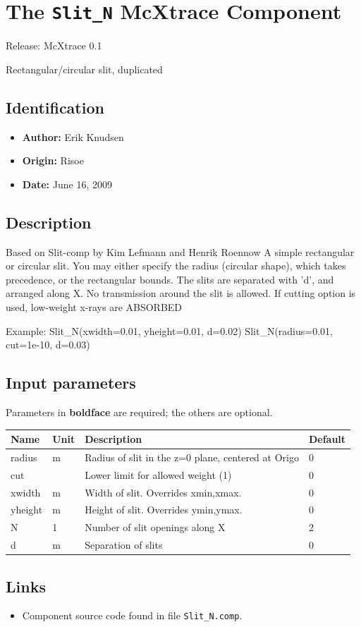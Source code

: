 \section{The \texttt{Slit\_N} McXtrace Component}
Release: McXtrace 0.1

Rectangular/circular slit, duplicated

\subsection*{Identification}
\begin{itemize}
  \item \textbf{Author:} Erik Knudsen
  \item \textbf{Origin:} Risoe
  \item \textbf{Date:} June 16, 2009
\end{itemize}

\subsection*{Description}
Based on Slit-comp by Kim Lefmann and Henrik Roennow A simple rectangular or circular slit. You may either specify the radius (circular shape), which takes precedence, or the rectangular bounds. The slits are separated with 'd', and arranged along X. No transmission around the slit is allowed. If cutting option is used, low-weight x-rays are ABSORBED

Example: Slit\_N(xwidth=0.01, yheight=0.01, d=0.02) Slit\_N(radius=0.01, cut=1e-10, d=0.03)

\subsection*{Input parameters}
Parameters in \textbf{boldface} are required; the others are optional.

\begin{longtable}{p{}p{}p{}p{}}
\toprule
\textbf{Name} & \textbf{Unit} & \textbf{Description} & \textbf{Default} \\
\midrule
\endhead
radius & m & Radius of slit in the z=0 plane, centered at Origo & 0 \\
cut &  & Lower limit for allowed weight (1) & 0 \\
xwidth & m & Width of slit. Overrides xmin,xmax. & 0 \\
yheight & m & Height of slit. Overrides ymin,ymax. & 0 \\
N & 1 & Number of slit openings along X & 2 \\
d & m & Separation of slits & 0 \\
\bottomrule
\end{longtable}

\subsection*{Links}
\begin{itemize}
  \item Component source code found in file \texttt{Slit\_N.comp}.
\end{itemize}
